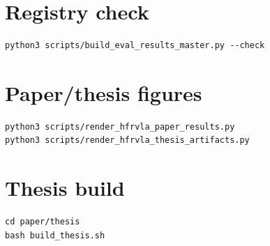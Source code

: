 \documentclass[12pt,a4paper,oneside]{report}
\begin{document}
\section{Registry check}

\begin{verbatim}
python3 scripts/build_eval_results_master.py --check
\end{verbatim}

\section{Paper/thesis figures}

\begin{verbatim}
python3 scripts/render_hfrvla_paper_results.py
python3 scripts/render_hfrvla_thesis_artifacts.py
\end{verbatim}

\section{Thesis build}

\begin{verbatim}
cd paper/thesis
bash build_thesis.sh
\end{verbatim}



\end{document}
